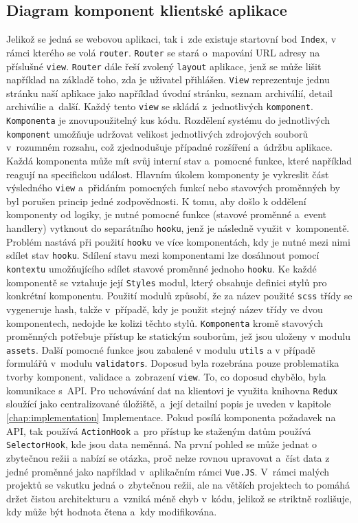 \subsection{Diagram komponent klientské aplikace}
Jelikož se jedná se webovou aplikaci, tak i~zde existuje startovní bod \texttt{Index}, v rámci kterého se volá \texttt{router}. \texttt{Router} se stará o~mapování URL adresy na příslušné \texttt{view}. \texttt{Router} dále řeší zvolený \texttt{layout} aplikace, jenž se může lišit například na základě toho, zda je uživatel přihlášen. \texttt{View} reprezentuje jednu stránku naší aplikace jako například úvodní stránku, seznam archiválií, detail archiválie a~další. Každý tento \texttt{view} se skládá z~jednotlivých \texttt{komponent}. \texttt{Komponenta} je znovupoužitelný kus kódu. Rozdělení systému do jednotlivých \texttt{komponent} umožňuje udržovat velikost jednotlivých zdrojových souborů v~rozumném rozsahu, což zjednodušuje případné rozšíření a~údržbu aplikace. Každá komponenta může mít svůj interní stav a~pomocné funkce, které například reagují na specifickou událost. Hlavním úkolem komponenty je vykreslit část výsledného \texttt{view} a~přidáním pomocných funkcí nebo stavových proměnných by byl porušen princip jedné zodpovědnosti. K tomu, aby došlo k oddělení komponenty od logiky, je nutné pomocné funkce (stavové proměnné a~event handlery) vytknout do separátního \texttt{hooku}, jenž je následně využit v~komponentě. Problém nastává při použití \texttt{hooku} ve více komponentách, kdy je nutné mezi nimi sdílet stav \texttt{hooku}. Sdílení stavu mezi komponentami lze dosáhnout pomocí \texttt{kontextu} umožňujícího sdílet stavové proměnné jednoho \texttt{hooku}. Ke každé komponentě se vztahuje její \texttt{Styles} modul, který obsahuje definici stylů pro konkrétní komponentu. Použití modulů způsobí, že za název použité \texttt{scss} třídy se vygeneruje hash, takže v~případě, kdy je použit stejný název třídy ve dvou komponentech, nedojde ke kolizi těchto stylů. \texttt{Komponenta} kromě stavových proměnných potřebuje přístup ke statickým souborům, jež jsou uloženy v modulu \texttt{assets}. Další pomocné funkce jsou zabalené v modulu \texttt{utils} a v případě formulářů v~modulu \texttt{validators}. Doposud byla rozebrána pouze problematika tvorby komponent, validace a~zobrazení \texttt{view}. To, co doposud chybělo, byla komunikace s~API. Pro uchovávání dat na klientovi je využita knihovna \texttt{Redux} sloužící jako centralizované úložiště, a~její detailní popis je uveden v kapitole \ref{chap:implementation} Implementace. Pokud posílá komponenta požadavek na API, tak používá \texttt{ActionHook} a~pro přístup ke staženým datům používá \texttt{SelectorHook}, kde jsou data neměnná. Na první pohled se může jednat o zbytečnou režii a nabízí se otázka, proč nelze rovnou upravovat a~číst data z jedné proměnné jako například v~aplikačním rámci \texttt{Vue.JS}. V~rámci malých projektů se vskutku jedná o~zbytečnou režii, ale na větších projektech to pomáhá držet čistou architekturu a~vzniká méně chyb v~kódu, jelikož se striktně rozlišuje, kdy může být hodnota čtena a~kdy modifikována.

